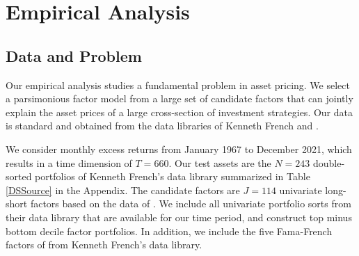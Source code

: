 \documentclass[11pt]{article}
\newcommand\bnotetab[1]{\captionsetup{position=bottom, font=footnotesize,  textfont=normalfont, margin=1mm, skip=2mm, justification=justified, singlelinecheck=false}\caption*{#1}}
\begin{document}

\section{Empirical Analysis}\label{sec:empirics}


%
%
%
%

\subsection{Data and Problem}

Our empirical analysis studies a fundamental problem in asset pricing. We select a parsimonious factor model from a large set of candidate factors that can jointly explain the asset prices of a large cross-section of investment strategies. Our data is standard and obtained from the data libraries of Kenneth French and \cite{HouEtAl}. 


We consider monthly excess returns from January 1967 to December 2021, which results in a time dimension of $T=660$. Our test assets are the $N = 243$ double-sorted portfolios of Kenneth French's data library summarized in Table \ref{DSSource} in the Appendix. The candidate factors are $J=114$ univariate long-short factors based on the data of \cite{HouEtAl}. We include all univariate portfolio sorts from their data library that are available for our time period, and construct top minus bottom decile factor portfolios. In addition, we include the five Fama-French factors of \cite{FAMA20151} from Kenneth French's data library.
\end{document}
